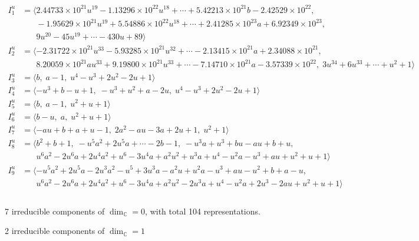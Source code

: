 \documentclass[1p]{elsarticle_modified}
\theoremstyle{definition}
\begin{document}
\begin{align*}
I^u_{1}&=\langle 
2.44733\times10^{21} u^{19}-1.13296\times10^{22} u^{18}+\cdots+5.42213\times10^{21} b-2.42529\times10^{22},\\
\phantom{I^u_{1}}&\phantom{= \langle  }-1.95629\times10^{21} u^{19}+5.54886\times10^{22} u^{18}+\cdots+2.41285\times10^{23} a+6.92349\times10^{23},\\
\phantom{I^u_{1}}&\phantom{= \langle  }9 u^{20}-45 u^{19}+\cdots-430 u+89\rangle \\
I^u_{2}&=\langle 
-2.31722\times10^{21} u^{33}-5.93285\times10^{21} u^{32}+\cdots-2.13415\times10^{21} a+2.34088\times10^{21},\\
\phantom{I^u_{2}}&\phantom{= \langle  }8.20059\times10^{21} a u^{33}+9.19800\times10^{21} u^{33}+\cdots-7.14710\times10^{21} a-3.57339\times10^{22},\;3 u^{34}+6 u^{33}+\cdots+u^2+1\rangle \\
I^u_{3}&=\langle 
b,\;a-1,\;u^4- u^3+2 u^2-2 u+1\rangle \\
I^u_{4}&=\langle 
- u^3+b- u+1,\;- u^3+u^2+a-2 u,\;u^4- u^3+2 u^2-2 u+1\rangle \\
I^u_{5}&=\langle 
b,\;a-1,\;u^2+u+1\rangle \\
I^u_{6}&=\langle 
b- u,\;a,\;u^2+u+1\rangle \\
I^u_{7}&=\langle 
- a u+b+a+u-1,\;2 a^2- a u-3 a+2 u+1,\;u^2+1\rangle \\
I^u_{8}&=\langle 
b^2+b+1,\;- u^5 a^2+2 u^5 a+\cdots-2 b-1,\;- u^3 a+u^3+b u- a u+b+u,\\
\phantom{I^u_{8}}&\phantom{= \langle  }u^6 a^2-2 u^6 a+2 u^4 a^2+u^6-3 u^4 a+a^2 u^2+u^3 a+u^4- u^2 a- u^3+a u+u^2+u+1\rangle \\
I^u_{9}&=\langle 
- u^5 a^2+2 u^5 a-2 u^3 a^2- u^5+3 u^3 a- a^2 u+u^2 a- u^3+a u- u^2+b+a- u,\\
\phantom{I^u_{9}}&\phantom{= \langle  }u^6 a^2-2 u^6 a+2 u^4 a^2+u^6-3 u^4 a+a^2 u^2-2 u^3 a+u^4- u^2 a+2 u^3-2 a u+u^2+u+1\rangle \\
\\
\end{align*}
\raggedright * 7 irreducible components of $\dim_{\mathbb{C}}=0$, with total 104 representations.\\
\raggedright * 2 irreducible components of $\dim_{\mathbb{C}}=1$ \\
\newpage
\renewcommand{\arraystretch}{1}
\end{document}
